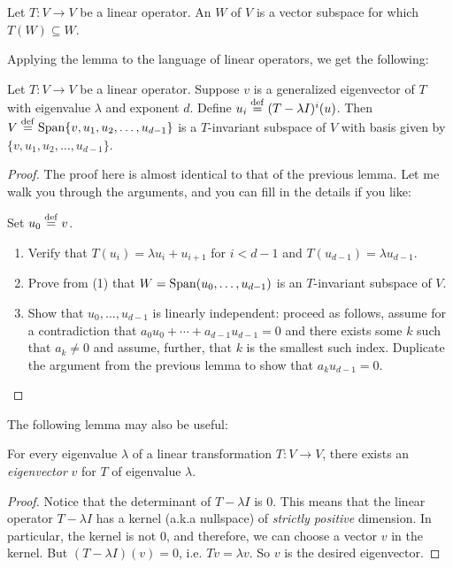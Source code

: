 \begin{defn}
Let $T: V \to V$ be a linear operator. An  $W$ of $V$ is a vector subspace for which $T(W) 
\subseteq W$. 
\end{defn}

Applying the lemma to the language of linear operators, we get
the following:

\begin{lem}
Let $T: V \to V$ be a linear operator. Suppose $v$ is a 
generalized eigenvector of $T$ with eigenvalue $\lambda$ and
exponent $d$. Define $u_i \stackrel{\mathrm{def}}{=} (T - \lambda I)^i(u)$. Then $V 
\stackrel{\mathrm{def}}{=} \mathrm{Span}\{v,u_1, u_2,\dots,u_{d - 1}\}$ is a $T$-invariant
subspace of $V$ with basis given by $\{v, u_1, u_2,\dots,
u_{d - 1}\}$.
\end{lem}
\begin{proof}
The proof here is almost identical to that of the previous lemma.
Let me walk you through the arguments, and you can fill in the 
details if you like:

Set $u_0 \stackrel{\mathrm{def}}{=} v$.

\begin{enumerate}
\item Verify that $T(u_i) = \lambda u_i + u_{i + 1}$ for $i < d - 1$
and $T(u_{d - 1}) = \lambda u_{d - 1}$.

\item Prove from (1) that $W = \mathrm{Span}(u_0,\dots,u_{d - 1})$ is an
$T$-invariant subspace of $V$.

\item Show that $u_0,\dots,u_{d - 1}$ is linearly independent:
proceed as follows, assume for a contradiction that $a_0u_0 + 
\cdots + a_{d - 1}u_{d - 1} = 0$ and there exists some $k$ such
that $a_k \neq 0$ and assume, further, that $k$ is the smallest
such index. Duplicate the argument from the previous lemma 
to show that $a_k u_{d - 1} = 0$.
\end{enumerate}
\end{proof}

The following lemma may also be useful:

\begin{lem}\label{lem:eigenvector_always_exists}
For every eigenvalue $\lambda$ of a linear transformation $T: V 
\to V$, there exists an \emph{eigenvector} $v$ for $T$ of
eigenvalue $\lambda$.
\end{lem}
\begin{proof}
Notice that the determinant of $T - \lambda I$ is $0$. This means 
that the linear operator $T - \lambda I$ has a kernel (a.k.a nullspace)
of \emph{strictly positive} dimension. In particular, the kernel
is not $0$, and therefore, we can choose a vector $v$ in the
kernel. But $(T - \lambda I)(v) = 0$, i.e. $Tv = \lambda v$. 
So $v$ is the desired eigenvector.
\end{proof}


